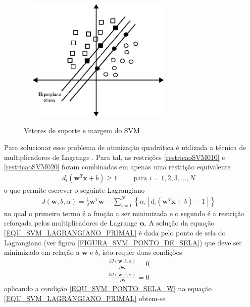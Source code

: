 \begin{figure}[hbt]
  \centering
  \caption{Vetores de suporte e margem do SVM}
  \includegraphics[width=8cm,height=6cm]{./secoes/conceitosFundamentais/pics/img/VetoresDeSuporteSVM.eps}
  \label{FIGURA_SVM_Vetores_Suporte}
  \vspace{0.1cm}
\end{figure}
\noindent
Para solucionar esse problema de otimização quadrática é utilizada a técnica de multiplicadores de Lagrange \cite{Stewart2013}. Para tal, as restrições \eqref{restricaoSVM010} e \eqref{restricaoSVM020} foram combinadas em apenas uma restrição equivalente
\begin{align}
d_{i}(\mathbf{w}^{T}\mathbf{x} + b )  \geq 1  \qquad \textrm{ para } i = 1, 2, 3, \ldots, N \label{EQU_SVM_RESTRICAO_CONJUNTA}
\end{align}
o que permite escrever o seguinte Lagrangiano
\begin{align}
J(\mathbf{w}, b, \alpha) = \frac{1}{2}\mathbf{w}^{T}\mathbf{w} - \sum\limits_{i=1}^{N} \left\{ \alpha_{i}[d_{i}(\mathbf{w}^{T}\mathbf{x} + b) - 1] \right\} \label{EQU_SVM_LAGRANGIANO_PRIMAL}
\end{align}
no qual o primeiro termo é a função a ser minimizada e o segundo é a restrição reforçada pelos multiplicadores de Lagrange \(\mathbf{\alpha}\). A solução da equação \eqref{EQU_SVM_LAGRANGIANO_PRIMAL} é dada pelo ponto de sela do Lagrangiano (ver figura \ref{FIGURA_SVM_PONTO_DE_SELA}) que deve ser minimizado em relação a \(\mathbf{w}\) e \(b\), isto requer duas condições
\begin{align}
 \frac{\partial J(\mathbf{w}, b, \alpha)}{\partial \mathbf{w}} = 0	\label{EQU_SVM_PONTO_SELA_W}\\
 \frac{\partial J(\mathbf{w}, b, \alpha)}{\partial b} = 0  	\label{EQU_SVM_PONTO_SELA_B}
\end{align}
aplicando a condição \eqref{EQU_SVM_PONTO_SELA_W} na equação \eqref{EQU_SVM_LAGRANGIANO_PRIMAL} obtem-se 
